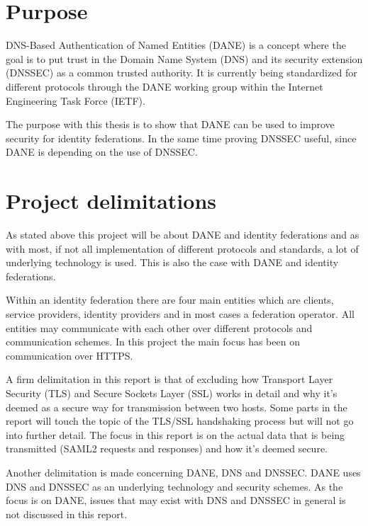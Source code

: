 \section{Purpose}
DNS-Based Authentication of Named Entities (DANE) \cite{rfc:6394,rfc:draft-dane,rfc:draft-smime} is a concept where the goal is to put trust in the Domain Name System (DNS) and its security extension (DNSSEC) \cite{rfc:4033,rfc:4034,rfc:4035,rfc:5011} as a common trusted authority.
It is currently being standardized for different protocols through the DANE working group \cite{website:dane-wg} within the Internet Engineering Task Force (IETF).

The purpose with this thesis is to show that DANE can be used to improve security for identity federations.
In the same time proving DNSSEC useful, since DANE is depending on the use of DNSSEC.

\section{Project delimitations}
As stated above this project will be about DANE and identity federations and as with most, if not all implementation of different protocols and standards, a lot of underlying technology is used.
This is also the case with DANE and identity federations.

Within an identity federation there are four main entities which are clients, service providers, identity providers and in most cases a federation operator.
All entities may communicate with each other over different protocols and communication schemes.
In this project the main focus has been on communication over HTTPS.

A firm delimitation in this report is that of excluding how Transport Layer Security (TLS) and Secure Sockets Layer (SSL) works in detail and why it's deemed as a secure way for transmission between two hosts.
Some parts in the report will touch the topic of the TLS/SSL handshaking process but will not go into further detail.
The focus in this report is on the actual data that is being transmitted (SAML2 requests and responses) and how it's deemed secure. 

Another delimitation is made concerning DANE, DNS and DNSSEC.
DANE uses DNS and DNSSEC as an underlying technology and security schemes.
As the focus is on DANE, issues that may exist with DNS and DNSSEC in general is not discussed in this report.




